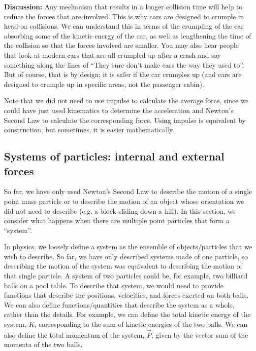 \documentclass[9pt,arxiv,red]{lapreprint}
\begin{document}
\begin{framed}
\begin{framed}
\textbf{Discussion:} Any mechanism that results in a longer collision time will help to reduce the forces that are involved. This is why cars are designed to crumple in head-on collisions. We can understand this in terms of the crumpling of the car absorbing some of the kinetic energy of the car, as well as lengthening the time of the collision so that the forces involved are smaller. You may also hear people that look at modern cars that are all crumpled up after a crash and say something along the lines of ``They sure don't make cars the way they used to''. But of course, that is by design; it is safer if the car crumples up (and cars are designed to crumple up in specific areas, not the passenger cabin).

Note that we did not need to use impulse to calculate the average force, since we could have just used kinematics to determine the acceleration and Newton's Second Law to calculate the corresponding force. Using impulse is equivalent by construction, but sometimes, it is easier mathematically.
\end{framed}
\end{framed}

\subsection{Systems of particles: internal and external forces}

So far, we have only used Newton's Second Law to describe the motion of a single point mass particle or to describe the motion of an object whose orientation we did not need to describe (e.g. a block sliding down a hill). In this section, we consider what happens when there are multiple point particles that form a ``system''.

In physics, we loosely define a system as the ensemble of objects/particles that we wish to describe. So far, we have only described systems made of one particle, so describing the motion of the system was equivalent to describing the motion of that single particle. A  system of two particles could be, for example, two billiard balls on a pool table. To describe that system, we would need to provide functions that describe the positions, velocities, and forces exerted on both balls. We can also define functions/quantities that describe the system as a whole, rather than the details. For example, we can define the total kinetic energy of the system, $K$, corresponding to the sum of kinetic energies of the two balls. We can also define the total momentum of the system, $\vec P$, given by the vector sum of the momenta of the two balls.
\end{document}
